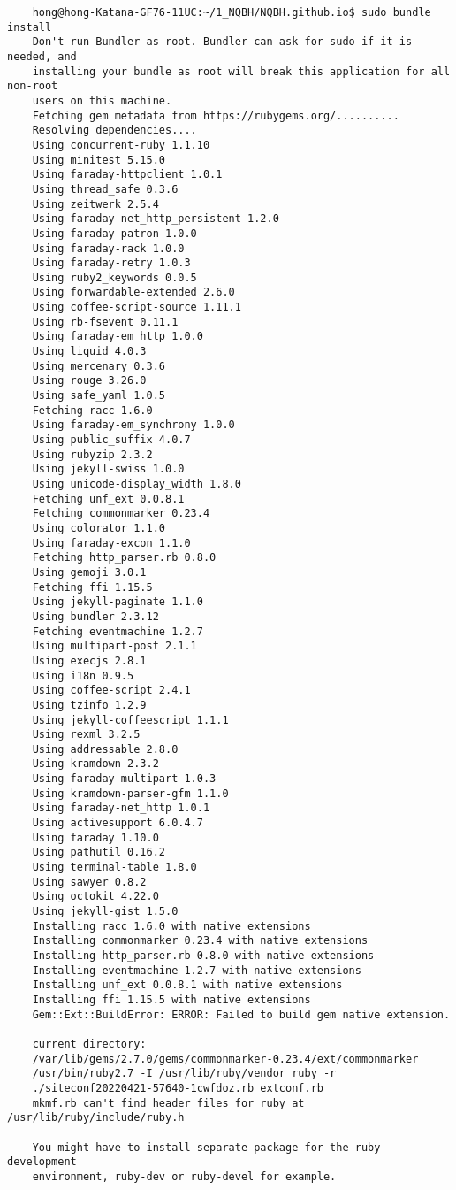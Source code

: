 \documentclass{article}
\numberwithin{equation}{section}
\begin{document}
\begin{verbatim}
	hong@hong-Katana-GF76-11UC:~/1_NQBH/NQBH.github.io$ sudo bundle install
	Don't run Bundler as root. Bundler can ask for sudo if it is needed, and
	installing your bundle as root will break this application for all non-root
	users on this machine.
	Fetching gem metadata from https://rubygems.org/..........
	Resolving dependencies....
	Using concurrent-ruby 1.1.10
	Using minitest 5.15.0
	Using faraday-httpclient 1.0.1
	Using thread_safe 0.3.6
	Using zeitwerk 2.5.4
	Using faraday-net_http_persistent 1.2.0
	Using faraday-patron 1.0.0
	Using faraday-rack 1.0.0
	Using faraday-retry 1.0.3
	Using ruby2_keywords 0.0.5
	Using forwardable-extended 2.6.0
	Using coffee-script-source 1.11.1
	Using rb-fsevent 0.11.1
	Using faraday-em_http 1.0.0
	Using liquid 4.0.3
	Using mercenary 0.3.6
	Using rouge 3.26.0
	Using safe_yaml 1.0.5
	Fetching racc 1.6.0
	Using faraday-em_synchrony 1.0.0
	Using public_suffix 4.0.7
	Using rubyzip 2.3.2
	Using jekyll-swiss 1.0.0
	Using unicode-display_width 1.8.0
	Fetching unf_ext 0.0.8.1
	Fetching commonmarker 0.23.4
	Using colorator 1.1.0
	Using faraday-excon 1.1.0
	Fetching http_parser.rb 0.8.0
	Using gemoji 3.0.1
	Fetching ffi 1.15.5
	Using jekyll-paginate 1.1.0
	Using bundler 2.3.12
	Fetching eventmachine 1.2.7
	Using multipart-post 2.1.1
	Using execjs 2.8.1
	Using i18n 0.9.5
	Using coffee-script 2.4.1
	Using tzinfo 1.2.9
	Using jekyll-coffeescript 1.1.1
	Using rexml 3.2.5
	Using addressable 2.8.0
	Using kramdown 2.3.2
	Using faraday-multipart 1.0.3
	Using kramdown-parser-gfm 1.1.0
	Using faraday-net_http 1.0.1
	Using activesupport 6.0.4.7
	Using faraday 1.10.0
	Using pathutil 0.16.2
	Using terminal-table 1.8.0
	Using sawyer 0.8.2
	Using octokit 4.22.0
	Using jekyll-gist 1.5.0
	Installing racc 1.6.0 with native extensions
	Installing commonmarker 0.23.4 with native extensions
	Installing http_parser.rb 0.8.0 with native extensions
	Installing eventmachine 1.2.7 with native extensions
	Installing unf_ext 0.0.8.1 with native extensions
	Installing ffi 1.15.5 with native extensions
	Gem::Ext::BuildError: ERROR: Failed to build gem native extension.
	
	current directory:
	/var/lib/gems/2.7.0/gems/commonmarker-0.23.4/ext/commonmarker
	/usr/bin/ruby2.7 -I /usr/lib/ruby/vendor_ruby -r
	./siteconf20220421-57640-1cwfdoz.rb extconf.rb
	mkmf.rb can't find header files for ruby at /usr/lib/ruby/include/ruby.h
	
	You might have to install separate package for the ruby development
	environment, ruby-dev or ruby-devel for example.
	

\end{verbatim}
\end{document}
